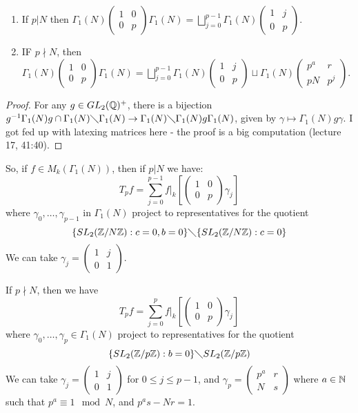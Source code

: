 \documentclass[10pt,a4paper]{article}
\begin{document}
\begin{proposition}\hspace*{0cm}
  \begin{enumerate}
    \item If $p |N$ then $\Gamma_1(N)\begin{pmatrix}1&0\\0&p\end{pmatrix}\Gamma_1(N) = \bigsqcup_{j=0}^{p-1}\Gamma_1(N) \begin{pmatrix}1&j\\0&p \end{pmatrix}$.

    \item IF $p \nmid N$, then $\Gamma_1(N)\begin{pmatrix}1&0\\0&p\end{pmatrix}\Gamma_1(N) = \bigsqcup_{j=0}^{p-1}\Gamma_1(N) \begin{pmatrix}1&j\\0&p \end{pmatrix} \sqcup \Gamma_1(N) \begin{pmatrix}p^a&r\\pN & p^j\end{pmatrix}$.
  \end{enumerate}
\end{proposition}
\begin{proof}
  For any $g \in GL_2(\mathbb{Q})^+$, there is a bijection $g^{-1}\Gamma_1(N)g \cap \Gamma_1(N)\diagdown \Gamma_1(N) \to \Gamma_1(N)\diagdown \Gamma_1(N)g\Gamma_1(N)$, given by $\gamma \mapsto \Gamma_1(N) g\gamma$. I got fed up with latexing matrices here  -  the proof is a big computation (lecture 17, 41:40).
\end{proof}
So, if $f \in M_k(\Gamma_1(N))$, then if $p |N$ we have:
\[T_p f = \sum_{j=0}^{p-1}f|_k\left[\begin{pmatrix}1&0\\0&p \end{pmatrix}\gamma_j\right]\]
where $\gamma_0, \ldots, \gamma_{p-1}$ in $\Gamma_1(N)$ project to representatives for the quotient
\[\{SL_2(\mathbb{Z}/N\mathbb{Z}): c = 0, b= 0 \}\diagdown \{SL_2(\mathbb{Z}/N\mathbb{Z}) : c = 0\}\]
We can take $\gamma_j = \begin{pmatrix}1&j\\0&1\end{pmatrix}$.

If $p \nmid N$, then we have
\[T_p f = \sum_{j=0}^{p}f|_k\left[\begin{pmatrix}1&0\\0&p \end{pmatrix}\gamma_j\right]\]
where $\gamma_0, \ldots, \gamma_p \in \Gamma_1(N)$ project to representatives for the quotient
\[\{SL_2(\mathbb{Z}/p\mathbb{Z}) : b = 0\} \diagdown SL_2(\mathbb{Z}/p\mathbb{Z})\]
We can take $\gamma_j = \begin{pmatrix}1&j\\0&1\end{pmatrix}$ for $0\leq j\leq p-1$, and $\gamma_p = \begin{pmatrix}p^a & r\\ N & s\end{pmatrix}$ where $a \in \mathbb{N}$ such that $p^a \equiv 1 \mod N$, and $p^a s - Nr = 1$.
\end{document}
